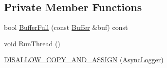 \subsection*{Private Member Functions}
\begin{DoxyCompactItemize}
\item 
bool \hyperlink{classapollo_1_1cyber_1_1logger_1_1AsyncLogger_a52f8a409bf0dceb86e9e484a494a166c}{Buffer\-Full} (const \hyperlink{structapollo_1_1cyber_1_1logger_1_1AsyncLogger_1_1Buffer}{Buffer} \&buf) const 
\item 
void \hyperlink{classapollo_1_1cyber_1_1logger_1_1AsyncLogger_af1600cd1348d78c6ab0e806928a2d50b}{Run\-Thread} ()
\item 
\hyperlink{classapollo_1_1cyber_1_1logger_1_1AsyncLogger_afa782e83a5e5d08d7ff7da08c6f194ac}{D\-I\-S\-A\-L\-L\-O\-W\-\_\-\-C\-O\-P\-Y\-\_\-\-A\-N\-D\-\_\-\-A\-S\-S\-I\-G\-N} (\hyperlink{classapollo_1_1cyber_1_1logger_1_1AsyncLogger}{Async\-Logger})
\end{DoxyCompactItemize}

